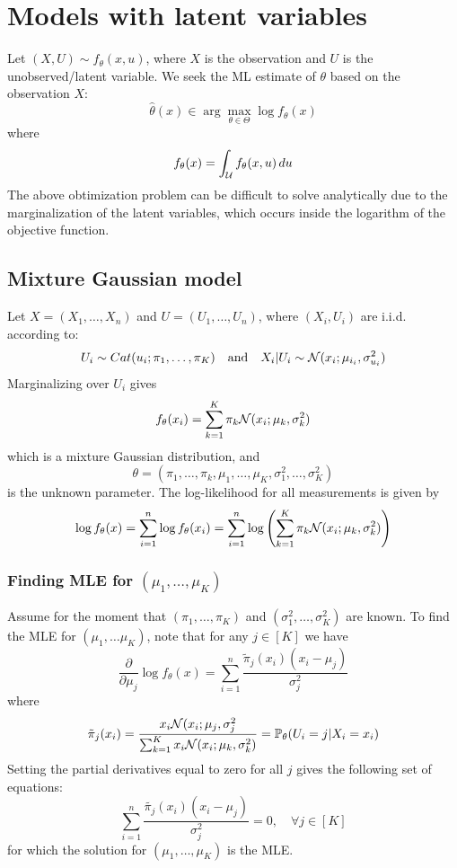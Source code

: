 \documentclass[11pt]{book}
\begin{document}
\section{Models with latent variables}
Let $(X,U) \sim f_\theta(x, u)$, where $X$ is the observation and $U$ is the unobserved/latent variable. We seek the ML estimate of $\theta$ based on the observation $X$: 
\[
  \hat{\theta}(x) \in \arg\max_{\theta\in\Theta} \log f_\theta(x)
\]
where 
\[
  f_\theta(x) = \int_{\mathcal{U}} f_\theta(x, u) \, du 
\] 
The above obtimization problem can be difficult to solve analytically due to the marginalization of the latent variables, 
which occurs inside the logarithm of the objective function.
\subsection{Mixture Gaussian model}
Let $X = (X_1, \dots, X_n)$ and $U = (U_1, \dots, U_n)$, where $(X_i, U_i)$ are i.i.d. according to: 
\[
  U_i \sim Cat(u_i; \pi_1, \dots, \pi_K) \quad\text{and}\quad X_i|U_i \sim \mathcal{N}(x_i; \mu_{i_i}, \sigma_{u_i}^2)
\]
Marginalizing over $U_i$ gives 
\[
  f_\theta(x_i) = \sum_{k=1}^K \pi_k \mathcal{N}(x_i; \mu_k, \sigma_k^2)
\] 
which is a mixture Gaussian distribution, and 
\[
  \theta = (\pi_1, \dots, \pi_k, \mu_1, \dots, \mu_K, \sigma_1^2, \dots, \sigma_K^2) 
\] 
is the unknown parameter. The log-likelihood for all measurements is given by 
\[
  \log f_\theta(x) = \sum_{i=1}^n \log f_\theta(x_i) = \sum_{i=1}^n \log \left( \sum_{k=1}^K \pi_k \mathcal{N} (x_i; \mu_k, \sigma_k^2) \right)
\]
\subsubsection{Finding MLE for $(\mu_1, \dots, \mu_K)$}
Assume for the moment that $(\pi_1, \dots, \pi_K)$ and $(\sigma_1^2, \dots, \sigma_K^2)$ are known. To find the MLE 
for $(\mu_1, \dots \mu_K)$, note that for any $j \in [K]$ we have 
\[
  \frac{\partial}{\partial \mu_j} \log f_\theta(x) = \sum_{i=1}^n \frac{\tilde{\pi}_j(x_i)(x_i - \mu_j)}{\sigma_j^2}
\]
where 
\[ 
  \tilde{\pi}_j (x_i) = \frac{x_i \mathcal{N}(x_i; \mu_j, \sigma_j^2}{\sum_{k=1}^K x_i \mathcal{N} (x_i; \mu_k, \sigma_k^2)} = \mathbb{P}_\theta(U_i = j | X_i = x_i)
\]
Setting the partial derivatives equal to zero for all $j$ gives the following set of equations: 
\[
  \sum_{i=1}^n \frac{\tilde{\pi_j}(x_i)(x_i - \mu_j)}{\sigma_j^2} = 0, \quad\forall j\in[K]
\]
for which the solution for $(\mu_1, \dots, \mu_K)$ is the MLE.
\end{document}
